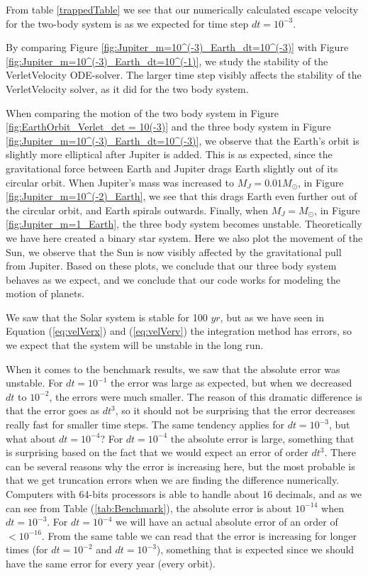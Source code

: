 \documentclass[norsk,a4paper,12pt]{article}
\begin{document}
{From table \ref{trappedTable} we see that our numerically calculated escape velocity for the two-body system is as we expected for time step $dt=10^{-3}$.

By comparing Figure \ref{fig:Jupiter_m=10^(-3)_Earth_dt=10^(-3)} with Figure \ref{fig:Jupiter_m=10^(-3)_Earth_dt=10^(-1)}, we study the stability of the VerletVelocity ODE-solver. The larger time step visibly affects the stability of the VerletVelocity solver, as it did for the two body system. 

\par

When comparing the motion of the two body system in Figure \ref{fig:EarthOrbit_Verlet_det = 10(-3)} and the three body system in Figure \ref{fig:Jupiter_m=10^(-3)_Earth_dt=10^(-3)}, we observe that the Earth's orbit is slightly more elliptical after Jupiter is added. This is as expected, since the gravitational force between Earth and Jupiter drags Earth slightly out of its circular orbit. When Jupiter's mass was increased to $M_J = 0.01 M_{\odot}$, in Figure \ref{fig:Jupiter_m=10^(-2)_Earth}, we see that this drags Earth even further out of the circular orbit, and Earth spirals outwards. Finally, when $M_J = M_{\odot}$, in Figure \ref{fig:Jupiter_m=1_Earth}, the three body system becomes unstable. Theoretically we have here created a binary star system. Here we also  plot the movement of the Sun, we observe that the Sun is now visibly affected by the gravitational pull from Jupiter. Based on these plots, we conclude that our three body system behaves as we expect, and we conclude that our code works for modeling the motion of planets.\par 
\vspace{3mm}
\par

We saw that the Solar system is stable for 100 $yr$, but as we have seen in Equation (\ref{eq:velVerx}) and (\ref{eq:velVerv}) the integration method has errors, so we expect that the system will be unstable in the long run. \par

When it comes to the benchmark results, we saw that the absolute error was unstable. For $dt=10^{-1}$ the error was large as expected, but when we decreased $dt$ to $10^{-2}$, the errors were much smaller. The reason of this dramatic difference is that the error goes as $dt^3$, so it should not be surprising that the error decreases really fast for smaller time steps. The same tendency applies for $dt=10^{-3}$, but what about $dt=10^{-4}$? For $dt=10^{-4}$ the absolute error is large, something that is surprising based on the fact that we would expect an error of order $dt^3$. There can be several reasons why the error is increasing here, but the most probable is that we get truncation errors when we are finding the difference numerically. Computers with 64-bits processors is able to handle about 16 decimals, and as we can see from Table (\ref{tab:Benchmark}), the absolute error is about $10^{-14}$ when $dt=10^{-3}$. For $dt=10^{-4}$ we will have an actual absolute error of an order of $ <10^{-16}$. From the same table we can read that the error is increasing for longer times (for $dt=10^{-2}$ and $dt=10^{-3}$), something that is expected since we should have the same error for every year (every orbit). 
}
\end{document}

